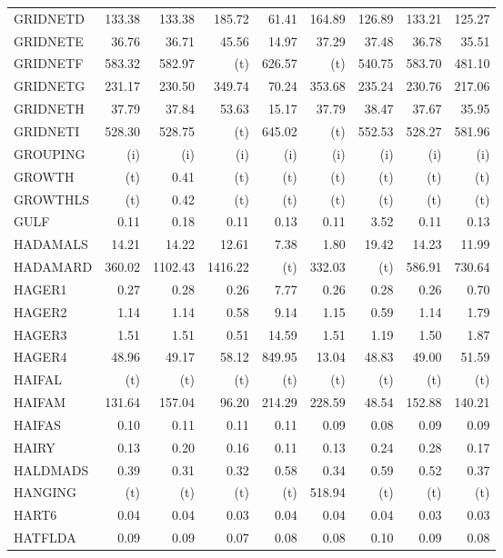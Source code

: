 \documentclass[11pt,twoside]{article}
\begin{document}
{\begin{longtable}[c]{|l|r|r|r|r|r|r|r|r|}
GRIDNETD & 133.38 & 133.38 & 185.72 & 61.41 & 164.89 & 126.89 & 133.21 & 125.27 \\
GRIDNETE & 36.76 & 36.71 & 45.56 & 14.97 & 37.29 & 37.48 & 36.78 & 35.51 \\
GRIDNETF & 583.32 & 582.97 & (t) & 626.57 & (t) & 540.75 & 583.70 & 481.10 \\
GRIDNETG & 231.17 & 230.50 & 349.74 & 70.24 & 353.68 & 235.24 & 230.76 & 217.06 \\
GRIDNETH & 37.79 & 37.84 & 53.63 & 15.17 & 37.79 & 38.47 & 37.67 & 35.95 \\
GRIDNETI & 528.30 & 528.75 & (t) & 645.02 & (t) & 552.53 & 528.27 & 581.96 \\
GROUPING & (i) & (i) & (i) & (i) & (i) & (i) & (i) & (i) \\
GROWTH & (t) & 0.41 & (t) & (t) & (t) & (t) & (t) & (t) \\
GROWTHLS & (t) & 0.42 & (t) & (t) & (t) & (t) & (t) & (t) \\
GULF & 0.11 & 0.18 & 0.11 & 0.13 & 0.11 & 3.52 & 0.11 & 0.13 \\
HADAMALS & 14.21 & 14.22 & 12.61 & 7.38 & 1.80 & 19.42 & 14.23 & 11.99 \\
HADAMARD & 360.02 & 1102.43 & 1416.22 & (t) & 332.03 & (t) & 586.91 & 730.64 \\
HAGER1 & 0.27 & 0.28 & 0.26 & 7.77 & 0.26 & 0.28 & 0.26 & 0.70 \\
HAGER2 & 1.14 & 1.14 & 0.58 & 9.14 & 1.15 & 0.59 & 1.14 & 1.79 \\
HAGER3 & 1.51 & 1.51 & 0.51 & 14.59 & 1.51 & 1.19 & 1.50 & 1.87 \\
HAGER4 & 48.96 & 49.17 & 58.12 & 849.95 & 13.04 & 48.83 & 49.00 & 51.59 \\
HAIFAL & (t) & (t) & (t) & (t) & (t) & (t) & (t) & (t) \\
HAIFAM & 131.64 & 157.04 & 96.20 & 214.29 & 228.59 & 48.54 & 152.88 & 140.21 \\
HAIFAS & 0.10 & 0.11 & 0.11 & 0.11 & 0.09 & 0.08 & 0.09 & 0.09 \\
HAIRY & 0.13 & 0.20 & 0.16 & 0.11 & 0.13 & 0.24 & 0.28 & 0.17 \\
HALDMADS & 0.39 & 0.31 & 0.32 & 0.58 & 0.34 & 0.59 & 0.52 & 0.37 \\
HANGING & (t) & (t) & (t) & (t) & 518.94 & (t) & (t) & (t) \\
HART6 & 0.04 & 0.04 & 0.03 & 0.04 & 0.04 & 0.04 & 0.03 & 0.03 \\
HATFLDA & 0.09 & 0.09 & 0.07 & 0.08 & 0.08 & 0.10 & 0.09 & 0.08 \\

\end{longtable}}
\end{document}

